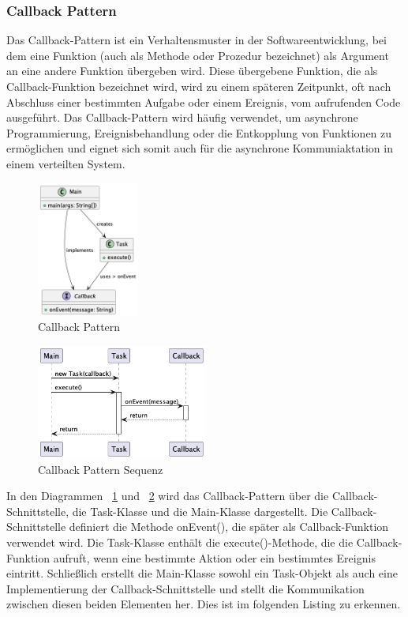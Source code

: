 \documentclass[../vs-script-first-v01.tex]{subfiles}
\begin{document}
\subsubsection{Callback Pattern}
Das Callback-Pattern ist ein Verhaltensmuster in der Softwareentwicklung, bei dem eine Funktion (auch als Methode oder Prozedur bezeichnet) als Argument an eine andere Funktion übergeben wird. Diese übergebene Funktion, die als Callback-Funktion bezeichnet wird, wird zu einem späteren Zeitpunkt, oft nach Abschluss einer bestimmten Aufgabe oder einem Ereignis, vom aufrufenden Code ausgeführt. Das Callback-Pattern wird häufig verwendet, um asynchrone Programmierung, Ereignisbehandlung oder die Entkopplung von Funktionen zu ermöglichen und eignet sich somit auch für die asynchrone Kommuniaktation in einem verteilten System.
\begin{figure}[ht!]
  \centering
  \includegraphics[width=0.30\textwidth]{fig/uml/callback-class.png}
  \caption{Callback Pattern}
  \label{fig:callback-class}
\end{figure}

\begin{figure}[ht!]
  \centering
  \includegraphics[width=0.50\textwidth]{fig/uml/callback-seq.png}
  \caption{Callback Pattern Sequenz}
  \label{fig:callback-seq}
\end{figure}

In den Diagrammen ~\ref{fig:callback-class} und ~\ref{fig:callback-seq} wird das Callback-Pattern über die Callback-Schnittstelle, die Task-Klasse und die Main-Klasse dargestellt. Die Callback-Schnittstelle definiert die Methode onEvent(), die später als Callback-Funktion verwendet wird. Die Task-Klasse enthält die execute()-Methode, die die Callback-Funktion aufruft, wenn eine bestimmte Aktion oder ein bestimmtes Ereignis eintritt. Schließlich erstellt die Main-Klasse sowohl ein Task-Objekt als auch eine Implementierung der Callback-Schnittstelle und stellt die Kommunikation zwischen diesen beiden Elementen her. Dies ist im folgenden Listing zu erkennen.\\\\
\end{document}
